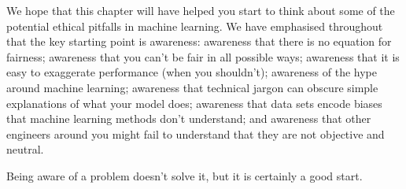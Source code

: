 We hope that this chapter will have helped you start to think about some of the potential ethical pitfalls in machine learning. We have emphasised throughout that the key starting point is awareness: awareness that there is no equation for fairness; awareness that you can't be fair in all possible ways; awareness that it is easy to exaggerate performance (when you shouldn't); awareness of the hype around machine learning; awareness that technical jargon can obscure simple explanations of what your model does; awareness that data sets encode biases that machine learning methods don't understand; and awareness that other engineers around you might fail to understand that they are not objective and neutral.

Being aware of a problem doesn't solve it, but it is certainly a good start.

\enlargethispage{1em}

%
%


